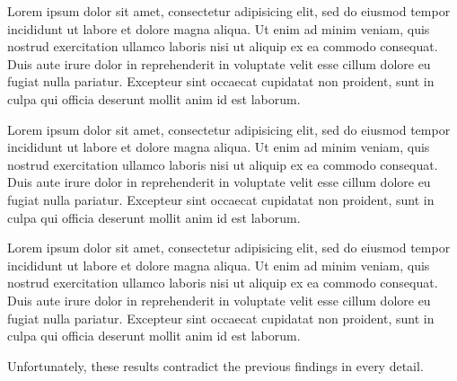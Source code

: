 \documentclass[10pt, %
showfigures %
]{jneurosci}
\newcommand{\loremipsum}{Lorem ipsum dolor sit amet, consectetur adipisicing elit, sed do eiusmod tempor incididunt ut labore et dolore magna aliqua. Ut enim ad minim veniam, quis nostrud exercitation ullamco laboris nisi ut aliquip ex ea commodo consequat. Duis aute irure dolor in reprehenderit in voluptate velit esse cillum dolore eu fugiat nulla pariatur. Excepteur sint occaecat cupidatat non proident, sunt in culpa qui officia deserunt mollit anim id est laborum.}
\begin{document}
\begin{methods}
\loremipsum
\end{methods}

\begin{results}
\loremipsum
\end{results}


\begin{discussion}
\loremipsum

Unfortunately, these results contradict the previous findings
\cite{greicius2003functional,fransson2008precuneus} in every detail.

\end{discussion}


\listoffigures
\end{document}
